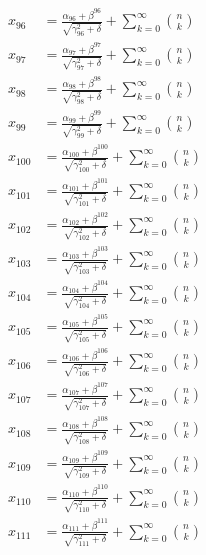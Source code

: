 \documentclass{article}
\begin{document}
\begin{align}
  x_{96} &= \frac{\alpha_{96} + \beta^{96}}{\sqrt{\gamma_{96}^2 + \delta}} + \sum_{k=0}^{\infty} \binom{n}{k} \label{eq:96} \\
  x_{97} &= \frac{\alpha_{97} + \beta^{97}}{\sqrt{\gamma_{97}^2 + \delta}} + \sum_{k=0}^{\infty} \binom{n}{k} \label{eq:97} \\
  x_{98} &= \frac{\alpha_{98} + \beta^{98}}{\sqrt{\gamma_{98}^2 + \delta}} + \sum_{k=0}^{\infty} \binom{n}{k} \label{eq:98} \\
  x_{99} &= \frac{\alpha_{99} + \beta^{99}}{\sqrt{\gamma_{99}^2 + \delta}} + \sum_{k=0}^{\infty} \binom{n}{k} \label{eq:99} \\
  x_{100} &= \frac{\alpha_{100} + \beta^{100}}{\sqrt{\gamma_{100}^2 + \delta}} + \sum_{k=0}^{\infty} \binom{n}{k} \label{eq:100} \\
  x_{101} &= \frac{\alpha_{101} + \beta^{101}}{\sqrt{\gamma_{101}^2 + \delta}} + \sum_{k=0}^{\infty} \binom{n}{k} \label{eq:101} \\
  x_{102} &= \frac{\alpha_{102} + \beta^{102}}{\sqrt{\gamma_{102}^2 + \delta}} + \sum_{k=0}^{\infty} \binom{n}{k} \label{eq:102} \\
  x_{103} &= \frac{\alpha_{103} + \beta^{103}}{\sqrt{\gamma_{103}^2 + \delta}} + \sum_{k=0}^{\infty} \binom{n}{k} \label{eq:103} \\
  x_{104} &= \frac{\alpha_{104} + \beta^{104}}{\sqrt{\gamma_{104}^2 + \delta}} + \sum_{k=0}^{\infty} \binom{n}{k} \label{eq:104} \\
  x_{105} &= \frac{\alpha_{105} + \beta^{105}}{\sqrt{\gamma_{105}^2 + \delta}} + \sum_{k=0}^{\infty} \binom{n}{k} \label{eq:105} \\
  x_{106} &= \frac{\alpha_{106} + \beta^{106}}{\sqrt{\gamma_{106}^2 + \delta}} + \sum_{k=0}^{\infty} \binom{n}{k} \label{eq:106} \\
  x_{107} &= \frac{\alpha_{107} + \beta^{107}}{\sqrt{\gamma_{107}^2 + \delta}} + \sum_{k=0}^{\infty} \binom{n}{k} \label{eq:107} \\
  x_{108} &= \frac{\alpha_{108} + \beta^{108}}{\sqrt{\gamma_{108}^2 + \delta}} + \sum_{k=0}^{\infty} \binom{n}{k} \label{eq:108} \\
  x_{109} &= \frac{\alpha_{109} + \beta^{109}}{\sqrt{\gamma_{109}^2 + \delta}} + \sum_{k=0}^{\infty} \binom{n}{k} \label{eq:109} \\
  x_{110} &= \frac{\alpha_{110} + \beta^{110}}{\sqrt{\gamma_{110}^2 + \delta}} + \sum_{k=0}^{\infty} \binom{n}{k} \label{eq:110} \\
  x_{111} &= \frac{\alpha_{111} + \beta^{111}}{\sqrt{\gamma_{111}^2 + \delta}} + \sum_{k=0}^{\infty} \binom{n}{k} \label{eq:111} \\

\end{align}
\end{document}
